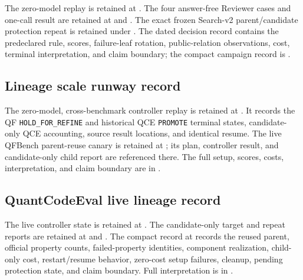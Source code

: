 The zero-model replay is retained at
. The four answer-free Reviewer cases
and one-call result are retained at
 and
. The exact frozen
Search-v2 parent/candidate protection repeat is retained under
.
The dated decision record contains the predeclared rule, scores, failure-leaf
rotation, public-relation observations, cost, terminal interpretation, and
claim boundary; the compact campaign record is
.

\subsection{Lineage scale runway record}

The zero-model, cross-benchmark controller replay is retained at
. It records the
QF \texttt{HOLD\_FOR\_REFINE} and historical QCE \texttt{PROMOTE} terminal
states, candidate-only QCE accounting, source result locations, and identical
resume. The live QFBench parent-reuse canary is retained at
; its plan,
controller result, and candidate-only child report are referenced there. The
full setup, scores, costs, interpretation, and claim boundary are in
.

\subsection{QuantCodeEval live lineage record}

The live controller state is retained at
.
The candidate-only target and repeat reports are retained at
and
.
The compact record at
 records the
reused parent, official property counts, failed-property identities, component
realization, child-only cost, restart/resume behavior, zero-cost setup failures,
cleanup, pending protection state, and claim boundary. Full interpretation is
in
.

